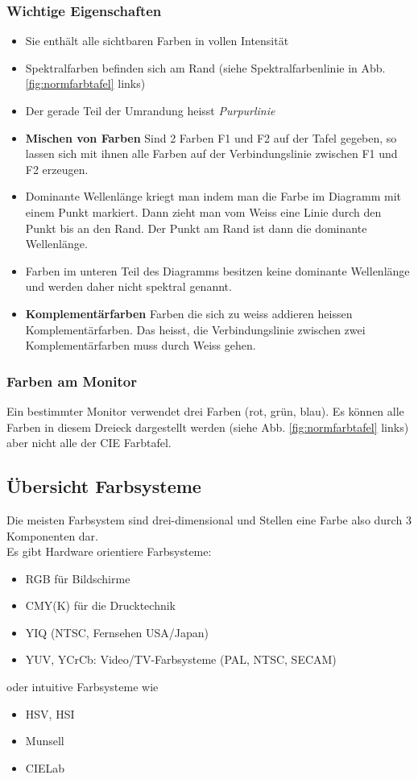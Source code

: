 \subsubsection{Wichtige Eigenschaften}
\begin{itemize}[leftmargin=1cm]
    \item Sie enthält alle sichtbaren Farben in vollen Intensität
    \item Spektralfarben befinden sich am Rand (siehe Spektralfarbenlinie in Abb. \ref{fig:normfarbtafel} links)
    \item Der gerade Teil der Umrandung heisst \textit{Purpurlinie}
    \item \textbf{Mischen von Farben} Sind 2 Farben F1 und F2 auf der Tafel gegeben, so lassen sich mit ihnen alle Farben auf der Verbindungslinie zwischen F1 und F2 erzeugen.
    \item Dominante Wellenlänge kriegt man indem man die Farbe im Diagramm mit einem Punkt markiert. Dann zieht man vom Weiss eine Linie durch den Punkt bis an den Rand. Der Punkt am Rand ist dann die dominante Wellenlänge.
    \item Farben im unteren Teil des Diagramms besitzen keine dominante Wellenlänge und werden daher nicht spektral genannt.
    \item \textbf{Komplementärfarben} Farben die sich zu weiss addieren heissen Komplementärfarben. Das heisst, die Verbindungslinie zwischen zwei Komplementärfarben muss durch Weiss gehen.
\end{itemize}
\subsubsection{Farben am Monitor}
Ein bestimmter Monitor verwendet drei Farben (rot, grün, blau). Es können alle Farben in diesem Dreieck dargestellt werden (siehe Abb. \ref{fig:normfarbtafel} links) aber nicht alle der CIE Farbtafel. 


\subsection{Übersicht Farbsysteme}
Die meisten Farbsystem sind drei-dimensional und Stellen eine Farbe also durch 3 Komponenten dar.\\
Es gibt Hardware orientiere Farbsysteme:
\begin{itemize}[leftmargin=1cm]
    \item RGB für Bildschirme
    \item CMY(K) für die Drucktechnik
    \item YIQ (NTSC, Fernsehen USA/Japan)
    \item YUV, YCrCb: Video/TV-Farbsysteme (PAL, NTSC, SECAM)
\end{itemize}
\noindent
oder intuitive Farbsysteme wie
\begin{itemize}[leftmargin=1cm]
    \item HSV, HSI
    \item Munsell
    \item CIELab
\end{itemize}




